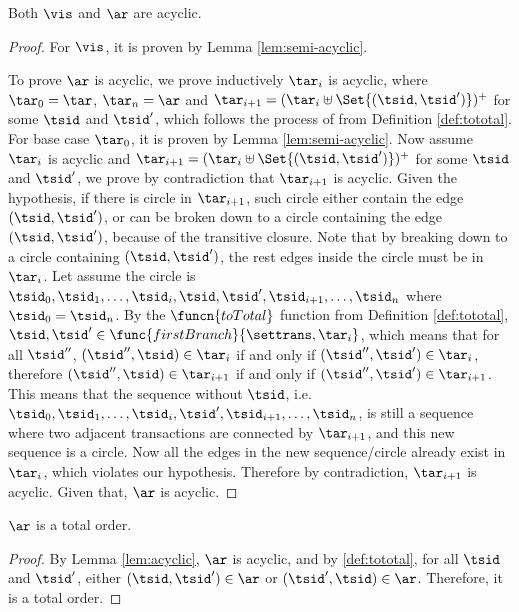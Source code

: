 \begin{lem}[Acyclic]
    \label{lem:acyclic}
    Both \( \vis \) and \( \ar \) are acyclic.
\end{lem}
\begin{proof}
    For \( \vis \), it is proven by Lemma \ref{lem:semi-acyclic}.

    To prove \( \ar \) is acyclic, we prove inductively \( \tar_{i} \) is acyclic, where \( \tar_{0} = \tar \), \( \tar_{n} = \ar \) and \( \tar_{i+1} = (\tar_{i} \uplus \Set{(\tsid, \tsid')})^{+} \) for some \( \tsid \) and \( \tsid' \), which follows the process of  from Definition \ref{def:tototal}.
    For base case \( \tar_{0} \), it is proven by Lemma \ref{lem:semi-acyclic}.
    Now assume \( \tar_{i} \) is acyclic and \( \tar_{i+1} = (\tar_{i} \uplus \Set{(\tsid, \tsid')})^{+} \) for some \( \tsid \) and \( \tsid' \), we prove by contradiction that \( \tar_{i+1} \) is acyclic.
    Given the hypothesis, if there is circle in \( \tar_{i+1} \), such circle either contain the edge \( (\tsid, \tsid') \), or can be broken down to a circle containing the edge \( (\tsid, \tsid') \), because of the transitive closure.
    Note that by breaking down to a circle containing \( ( \tsid, \tsid' ) \), the rest edges inside the circle must be in \( \tar_{i} \).
    Let assume the circle is \( \tsid_{0}, \tsid_{1}, \dots, \tsid_{i}, \tsid, \tsid', \tsid_{i+1}, \dots, \tsid_{n} \) where \( \tsid_{0} = \tsid_{n} \).
    By the \( \funcn{toTotal} \) function from Definition \ref{def:tototal}, \( \tsid, \tsid' \in \func{firstBranch}{\settrans, \tar_{i}}\), which means that for all \( \tsid'' \), \( (\tsid'', \tsid) \in \tar_{i} \) if and only if \( ( \tsid'', \tsid') \in \tar_{i} \), therefore \( (\tsid'', \tsid) \in \tar_{i+1} \) if and only if \( ( \tsid'', \tsid') \in \tar_{i+1} \).
    This means that the sequence without \( \tsid \), i.e.\ \( \tsid_{0}, \tsid_{1}, \dots, \tsid_{i}, \tsid', \tsid_{i+1}, \dots, \tsid_{n} \), is still a sequence where two adjacent transactions are connected by \( \tar_{i+1} \), and this new sequence is a circle.
    Now all the edges in the new sequence/circle already exist in \( \tar_{i} \), which violates our hypothesis.
    Therefore by contradiction, \( \tar_{i+1} \) is acyclic.
    Given that, \( \ar \) is acyclic.
\end{proof}

\begin{lem}
    \label{lem:totalorder}
    \( \ar \) is a total order.
\end{lem}
\begin{proof}
    By Lemma \ref{lem:acyclic}, \( \ar \) is acyclic, and by  \ref{def:tototal}, for all \( \tsid \) and \( \tsid' \), either \( (\tsid, \tsid') \in \ar \) or \( (\tsid', \tsid) \in \ar \).
    Therefore, it is a total order.
\end{proof}

